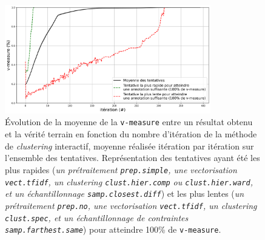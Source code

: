 			\begin{figure}[!htb]
				\centering
				\includegraphics[width=0.8\textwidth]{figures/etude-efficacite-evolution-moyenne-0par-iteration}
				\caption{Évolution de la moyenne de la \texttt{v-measure} entre un résultat obtenu et la vérité terrain en fonction du nombre d'itération de la méthode de \textit{clustering} interactif, moyenne réalisée itération par itération sur l'ensemble des tentatives.
				Représentation des tentatives ayant été les plus rapides (\textit{un prétraitement \texttt{prep.simple}, une vectorisation \texttt{vect.tfidf}, un clustering \texttt{clust.hier.comp} ou \texttt{clust.hier.ward}, et un échantillonnage \texttt{samp.closest.diff}}) et les plus lentes (\textit{un prétraitement \texttt{prep.no}, une vectorisation \texttt{vect.tfidf}, un clustering \texttt{clust.spec}, et un échantillonnage de contraintes \texttt{samp.farthest.same}}) pour atteindre 100\% de \texttt{v-measure}.}
				\label{figure:4.1.1-ETUDE-CONVERGENCE-EVOLUTION}
			\end{figure}
